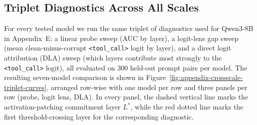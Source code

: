 \begin{table}[h]
\centering
\small
\caption{Per-model localization and shared-direction results.
$L^*$ is the commitment layer and depth is reported as a fraction of the total
decoder stack. Patch~(\%) is the top-1 \texttt{<tool\_call>} recovery rate
under a full-state clean patch at $(L^*, \text{pred})$. Suff.\ and Necc.\ are
the causal sufficiency and necessity scores for the shared direction
$\mu_\Delta$.}
\label{tab:appendix-crossscale-localization}
\end{table}

\subsection{Triplet Diagnostics Across All Scales}
\label{appendix:cross-scale:triplet}

For every tested model we run the same triplet of diagnostics used for Qwen3-8B
in Appendix~E: a linear probe sweep (AUC by layer), a logit-lens gap sweep
(mean clean-minus-corrupt \texttt{<tool\_call>} logit by layer), and a direct
logit attribution (DLA) sweep (which layers contribute most strongly to the
\texttt{<tool\_call>} logit), all evaluated on 300 held-out prompt pairs per
model. The resulting seven-model comparison is shown in
Figure~\ref{fig:appendix-crossscale-triplet-curves}, arranged row-wise with one
model per row and three panels per row (probe, logit lens, DLA). In every
panel, the dashed vertical line marks the activation-patching commitment layer
$L^*$, while the red dotted line marks the first threshold-crossing layer for
the corresponding diagnostic.


